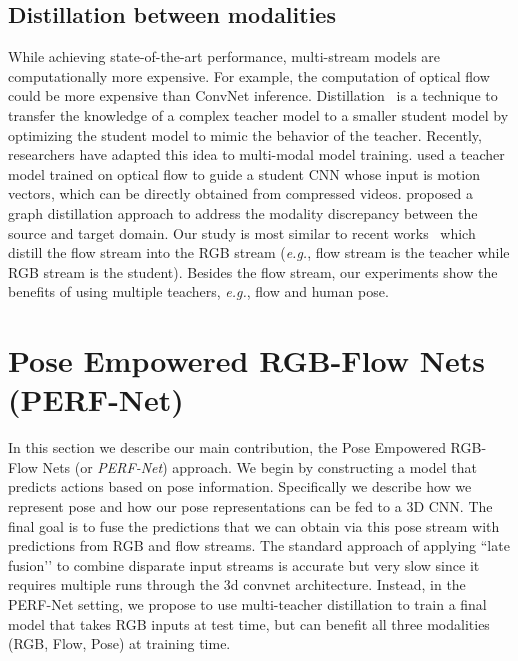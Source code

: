\documentclass[letterpaper]{article} \usepackage{aaai21}  \usepackage{times}  \usepackage{helvet} \usepackage{courier}  \usepackage[hyphens]{url}  \usepackage{graphicx} \urlstyle{rm} \def\UrlFont{\rm}  \usepackage{natbib}  \usepackage{caption} \frenchspacing  \setlength{\pdfpagewidth}{8.5in}  \setlength{\pdfpageheight}{11in}
\def\eg{\emph{e.g.}, }
\begin{document}
\subsection{Distillation between modalities}
While achieving state-of-the-art performance, multi-stream models are computationally more expensive. For example, the computation of optical flow could be more expensive than ConvNet inference. Distillation~\citet{bucilua2006model,hinton2015distilling} is a technique to transfer the knowledge of a complex teacher model to a smaller student model by optimizing the student model to mimic the behavior of the teacher. Recently, researchers have adapted this idea to multi-modal model training. \citet{zhang2016real} used a teacher model trained on optical flow to guide a student CNN whose input is motion vectors, which can be directly obtained from  compressed videos. \citet{luo2018graph} proposed a graph distillation approach to address the modality discrepancy between the source and target domain. Our study is most similar to  recent works~\citet{stroud2020d3d,crasto2019mars} which distill the flow stream into the RGB stream (\eg flow stream is the teacher while RGB stream is the student). Besides the flow stream, our experiments show the benefits of using multiple teachers, \eg flow and human pose. 




\section{Pose Empowered RGB-Flow Nets (PERF-Net)}\label{sec:multi-stream-framework}
\label{sec:multi-stream-framework}


In this section we describe our main contribution, the Pose Empowered RGB-Flow Nets (or \emph{PERF-Net}) approach.  
We begin by constructing a model that predicts actions based on pose information.  Specifically we describe how we represent pose and how our pose representations can be fed to a 3D CNN.  The final goal is to fuse the predictions that we can obtain via this pose stream with predictions from RGB and flow streams.  The standard approach of applying ``late fusion’’ to combine disparate input streams is accurate but very slow since it requires multiple runs through the 3d convnet architecture.  Instead, in the PERF-Net setting, we propose to use multi-teacher distillation to train a final model that takes RGB inputs at test time, but can benefit all three modalities (RGB, Flow, Pose) at training time.
\end{document}
